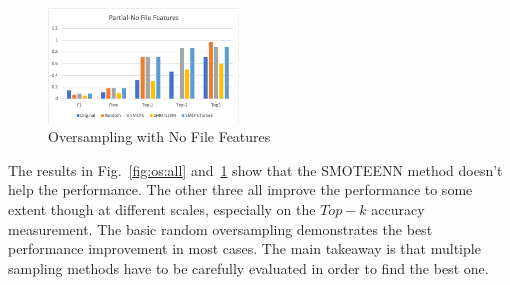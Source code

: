 \begin{figure}[!ht]
\begin{center}
\includegraphics[width=0.45\textwidth]{./figure/partial-nofile-oversampling}
\end{center}
\caption{Oversampling with No File Features}
\label{fig:os:nofile}
\end{figure}

The results in Fig.~\ref{fig:os:all} and~\ref{fig:os:nofile} show that the SMOTEENN method doesn't help the performance. The other three all improve the performance to some extent though at different scales, especially on the $Top-k$ accuracy measurement. The basic random oversampling demonstrates the best performance improvement in most cases.  The main takeaway is that multiple sampling methods have to be carefully evaluated in order to find the best one.
